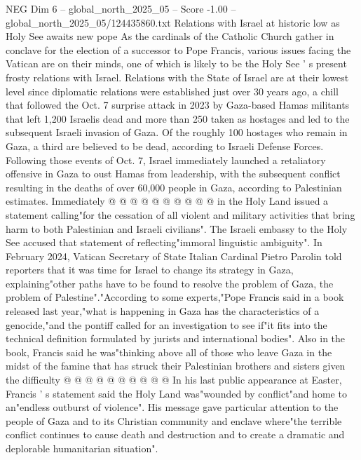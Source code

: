 \begin{textsample}{NEG Dim 6 – global\_north\_2025\_05 – Score -1.00 – global\_north\_2025\_05/124435860.txt}  \label{ex:f6_neg_414}
Relations with Israel at historic low as Holy See awaits new pope As the cardinals of the Catholic Church gather in conclave for the election of a successor to Pope Francis, various issues facing the Vatican are on their minds, one of which is likely to be the Holy See ' s present frosty relations with Israel.
Relations with the State of Israel are at their lowest level since diplomatic relations were established just over 30 years ago, a chill that followed the Oct. 7 surprise attack in 2023 by Gaza-based Hamas militants that left 1,200 Israelis dead and more than 250 taken as hostages and led to the subsequent Israeli invasion of Gaza.
Of the roughly 100 hostages who remain in Gaza, a third are believed to be dead, according to Israeli Defense Forces.
Following those events of Oct. 7, Israel immediately launched a retaliatory offensive in Gaza to oust Hamas from leadership, with the subsequent conflict resulting in the deaths of over 60,000 people in Gaza, according to Palestinian estimates.
Immediately @ @ @ @ @ @ @ @ @ @ in the Holy Land issued a statement calling"for the cessation of all violent and military activities that bring harm to both Palestinian and Israeli civilians".
The Israeli embassy to the Holy See accused that statement of reflecting"immoral linguistic ambiguity".
In February 2024, Vatican Secretary of State Italian Cardinal Pietro Parolin told reporters that it was time for Israel to change its strategy in Gaza, explaining"other paths have to be found to resolve the problem of Gaza, the problem of Palestine"."According to some experts,"Pope Francis said in a book released last year,"what is happening in Gaza has the characteristics of a genocide,"and the pontiff called for an investigation to see if"it fits into the technical definition formulated by jurists and international bodies".
Also in the book, Francis said he was"thinking above all of those who leave Gaza in the midst of the famine that has struck their Palestinian brothers and sisters given the difficulty @ @ @ @ @ @ @ @ @ @ In his last public appearance at Easter, Francis ' s statement said the Holy Land was"wounded by conflict"and home to an"endless outburst of violence".
His message gave particular attention to the people of Gaza and to its Christian community and enclave where"the terrible conflict continues to cause death and destruction and to create a dramatic and deplorable humanitarian situation".

\end{textsample}
